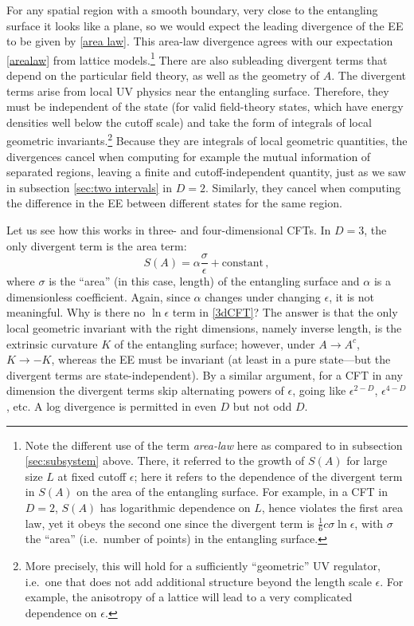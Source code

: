 \documentclass[11pt]{article}
\begin{document}
For any spatial region with a smooth boundary, very close to the entangling surface it looks like a plane, so we would expect the leading divergence of the EE to be given by \eqref{area law}. This area-law divergence agrees with our expectation \eqref{arealaw} from lattice models.\footnote{Note the different use of the term \emph{area-law} here as compared to in subsection \ref{sec:subsystem} above. There, it referred to the growth of $S(A)$ for large size $L$ at fixed cutoff $\epsilon$; here it refers to the dependence of the divergent term in $S(A)$ on the area of the entangling surface. For example, in a CFT in $D=2$, $S(A)$ has logarithmic dependence on $L$, hence violates the first area law, yet it obeys the second one since the divergent term is $\frac16c\sigma\ln\epsilon$, with $\sigma$ the ``area'' (i.e.\ number of points) in the entangling surface.} There are also subleading divergent terms that depend on the particular field theory, as well as the geometry of $A$. The divergent terms arise from local UV physics near the entangling surface. Therefore, they must be independent of the state (for valid field-theory states, which have energy densities well below the cutoff scale) and take the form of integrals of local geometric invariants.\footnote{More precisely, this will hold for a sufficiently ``geometric'' UV regulator, i.e.\ one that does not add additional structure beyond the length scale $\epsilon$. For example, the anisotropy of a lattice will lead to a very complicated dependence on $\epsilon$.} Because they are integrals of local geometric quantities, the divergences cancel when computing for example the mutual information of separated regions, leaving a finite and cutoff-independent quantity, just as we saw in subsection \ref{sec:two intervals} in $D=2$. Similarly, they cancel when computing the difference in the EE between different states for the same region.

Let us see how this works in three- and four-dimensional CFTs. In $D=3$, the only divergent term is the area term:
\begin{equation}\label{3dCFT}
S(A) = \alpha\frac\sigma\epsilon +\text{constant}\,,
\end{equation}
where $\sigma$ is the ``area'' (in this case, length) of the entangling surface and $\alpha$ is a dimensionless coefficient. Again, since $\alpha$ changes under changing $\epsilon$, it is not meaningful. Why is there no $\ln\epsilon$ term in \eqref{3dCFT}? The answer is that the only local geometric invariant with the right dimensions, namely inverse length, is the extrinsic curvature $K$ of the entangling surface; however, under $A\to A^c$, $K\to-K$, whereas the EE must be invariant (at least in a pure state---but the divergent terms are state-independent). By a similar argument, for a CFT in any dimension the divergent terms skip alternating powers of $\epsilon$, going like $\epsilon^{2-D}$, $\epsilon^{4-D}$, etc. A log divergence is permitted in even $D$ but not odd $D$.
\end{document}
